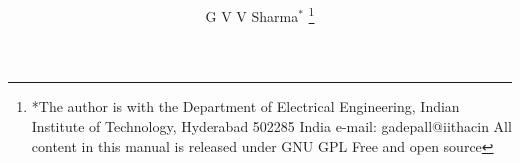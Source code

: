 \documentclass[journal,2pt,twocolumn]{IEEEtran}
\begin{document}
\makeatletter
{}
\makeatother

\let\StandardTheFigure\thefigure
\let\StandardTheTable\thetable
\renewcommand{\thetable}{\theproblem}


\vspace{3cm}

\title{ 
}



%
%
%

\author{G V V Sharma$^{*}$%
\thanks{*The author is with the Department
of Electrical Engineering, Indian Institute of Technology, Hyderabad
502285 India e-mail:  gadepall@iithacin All content in this manual is released under GNU GPL  Free and open source}%
}
% 
%
\end{document}
